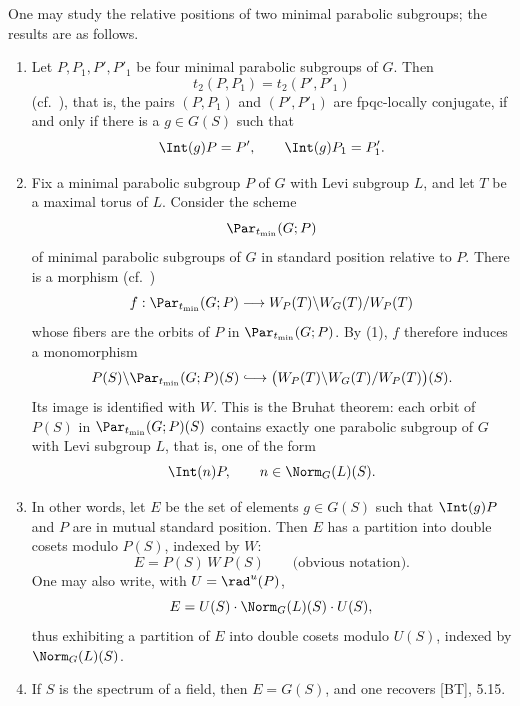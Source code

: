 
One may study the relative positions of two minimal parabolic
subgroups; the results are as follows.

\begin{enumerate}[label=\textup{(\arabic*)}]
\item Let \(P,P_1,P',P'_1\) be four minimal parabolic subgroups of
\(G\).  Then
\[
 t_2(P,P_1)=t_2(P',P'_1)
\]
\textup{(cf.\ )}, that is, the pairs \((P,P_1)\) and \((P',P'_1)\) are fpqc-locally
conjugate, if and only if there is a \(g\in G(S)\) such that
\[
 \Int(g)P=P',\qquad \Int(g)P_1=P'_1.
\]

\item Fix a minimal parabolic subgroup \(P\) of \(G\) with Levi
subgroup \(L\), and let \(T\) be a maximal torus of \(L\).  Consider
the scheme
\[
 \Par_{t_{\min}}(G;P)
\]
of minimal parabolic subgroups of \(G\) in standard position
relative to \(P\).  There is a morphism \textup{(cf.\ )}
\[
 f:\Par_{t_{\min}}(G;P)
   \longrightarrow W_P(T)\backslash W_G(T)/W_P(T)
\]
whose fibers are the orbits of \(P\) in
\(\Par_{t_{\min}}(G;P)\).  By \textup{(1)}, \(f\) therefore induces
a monomorphism
\[
 P(S)\backslash\Par_{t_{\min}}(G;P)(S)
 \lhook\joinrel\longrightarrow
 \bigl(W_P(T)\backslash W_G(T)/W_P(T)\bigr)(S).
\]
Its image is identified with \(W\).  This is the Bruhat theorem:
each orbit of \(P(S)\) in \(\Par_{t_{\min}}(G;P)(S)\) contains
exactly one parabolic subgroup of \(G\) with Levi subgroup \(L\),
that is, one of the form
\[
 \Int(n)P,\qquad n\in\Norm_G(L)(S).
\]

\item In other words, let \(E\) be the set of elements \(g\in G(S)\)
such that \(\Int(g)P\) and \(P\) are in mutual standard position.
Then \(E\) has a partition into double cosets modulo \(P(S)\),
indexed by \(W\):
\[
 E=P(S)\,W\,P(S)\qquad\text{(obvious notation)}.
\]
One may also write, with \(U=\rad^u(P)\),
\[
 E=U(S)\cdot\Norm_G(L)(S)\cdot U(S),
\]
thus exhibiting a partition of \(E\) into double cosets modulo
\(U(S)\), indexed by \(\Norm_G(L)(S)\).

\item If \(S\) is the spectrum of a field, then \(E=G(S)\), and
one recovers \textup{[BT]}, 5.15.
\end{enumerate}

